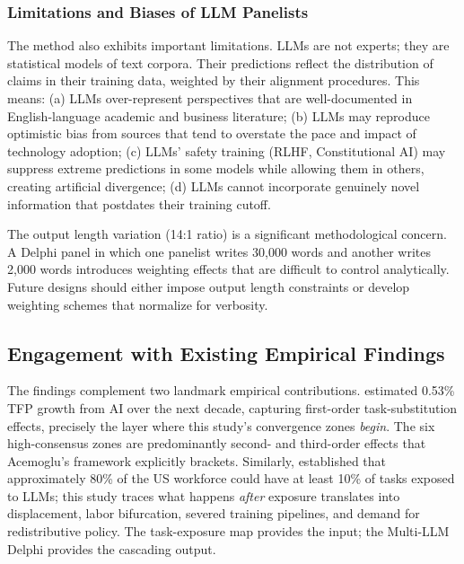 \documentclass[preprint,review,12pt]{elsarticle}
\begin{document}
\subsubsection{Limitations and Biases of LLM Panelists}
\label{sec:llm_limitations}

The method also exhibits important limitations. LLMs are not experts; they are statistical models of text corpora. Their predictions reflect the distribution of claims in their training data, weighted by their alignment procedures. This means: (a) LLMs over-represent perspectives that are well-documented in English-language academic and business literature; (b) LLMs may reproduce optimistic bias from sources that tend to overstate the pace and impact of technology adoption; (c) LLMs' safety training (RLHF, Constitutional AI) may suppress extreme predictions in some models while allowing them in others, creating artificial divergence; (d) LLMs cannot incorporate genuinely novel information that postdates their training cutoff.

The output length variation (14:1 ratio) is a significant methodological concern. A Delphi panel in which one panelist writes 30,000 words and another writes 2,000 words introduces weighting effects that are difficult to control analytically. Future designs should either impose output length constraints or develop weighting schemes that normalize for verbosity.


\subsection{Engagement with Existing Empirical Findings}
\label{sec:empirical_engagement}

The findings complement two landmark empirical contributions. \citet{acemoglu2024simplemacro} estimated 0.53\% TFP growth from AI over the next decade, capturing first-order task-substitution effects, precisely the layer where this study's convergence zones \textit{begin}. The six high-consensus zones are predominantly second- and third-order effects that Acemoglu's framework explicitly brackets. Similarly, \citet{eloundou2023gpts} established that approximately 80\% of the US workforce could have at least 10\% of tasks exposed to LLMs; this study traces what happens \textit{after} exposure translates into displacement, labor bifurcation, severed training pipelines, and demand for redistributive policy. The task-exposure map provides the input; the Multi-LLM Delphi provides the cascading output.
\end{document}
